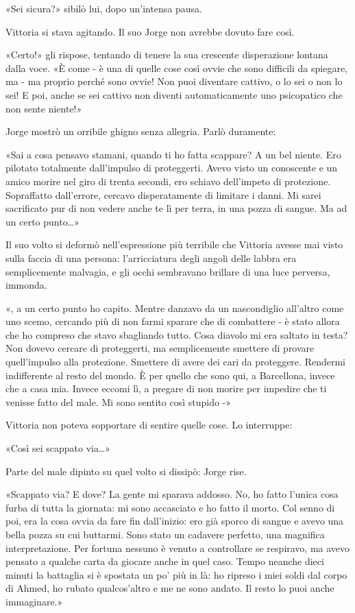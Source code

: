 «Sei sicura?» sibilò lui, dopo un'intensa pausa.

Vittoria si stava agitando. Il suo Jorge non avrebbe dovuto fare così.

«Certo!» gli rispose, tentando di tenere la sua crescente disperazione lontana dalla voce. «È come - è una di quelle cose così ovvie che sono difficili da spiegare, ma - ma proprio perché sono ovvie! Non puoi diventare cattivo, o lo sei o non lo sei! E poi, anche se sei cattivo non diventi automaticamente uno psicopatico che non sente niente!»

Jorge mostrò un orribile ghigno senza allegria. Parlò duramente:

«Sai a cosa pensavo stamani, quando ti ho fatta scappare? A un bel niente. Ero pilotato totalmente dall'impulso di proteggerti. Avevo visto un conoscente e un amico morire nel giro di trenta secondi, ero schiavo dell'impeto di protezione. Sopraffatto dall'errore, cercavo disperatamente di limitare i danni. Mi sarei sacrificato pur di non vedere anche te lì per terra, in una pozza di sangue. Ma ad un certo punto\ldots»

Il suo volto si deformò nell'espressione più terribile che Vittoria avesse mai visto sulla faccia di una persona: l'arricciatura degli angoli delle labbra era semplicemente malvagia, e gli occhi sembravano brillare di una luce perversa, immonda.

«, a un certo punto ho capito. Mentre danzavo da un nascondiglio all'altro come uno scemo, cercando più di non farmi sparare che di combattere - è stato allora che ho compreso che stavo sbagliando tutto. Cosa diavolo mi era saltato in testa? Non dovevo cercare di proteggerti, ma semplicemente smettere di provare quell'impulso alla protezione. Smettere di avere dei cari da proteggere. Rendermi indifferente al resto del mondo. È per quello che sono qui, a Barcellona, invece che a casa mia. Invece eccomi lì, a pregare di non morire per impedire che ti venisse fatto del male. Mi sono sentito così stupido -»

Vittoria non poteva sopportare di sentire quelle cose. Lo interruppe:

«Così sei scappato via\ldots»

Parte del male dipinto su quel volto si dissipò: Jorge rise.

«Scappato via? E dove? La gente mi sparava addosso. No, ho fatto l'unica cosa furba di tutta la giornata: mi sono accasciato e ho fatto il morto. Col senno di poi, era la cosa ovvia da fare fin dall'inizio: ero già sporco di sangue e avevo una bella pozza su cui buttarmi. Sono stato un cadavere perfetto, una magnifica interpretazione. Per fortuna nessuno è venuto a controllare se respiravo, ma avevo pensato a qualche carta da giocare anche in quel caso. Tempo neanche dieci minuti la battaglia si è spostata un po' più in là: ho ripreso i miei soldi dal corpo di Ahmed, ho rubato qualcos'altro e me ne sono andato. Il resto lo puoi anche immaginare.»

